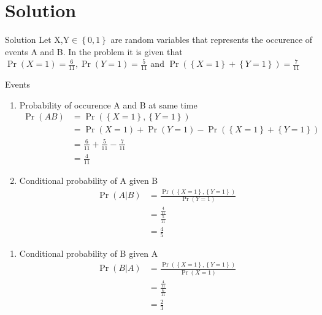 \documentclass{beamer}
\providecommand{\pr}[1]{\ensuremath{\Pr\left(#1\right)}}
\providecommand{\cbrak}[1]{\ensuremath{\left\{#1\right\}}}
\newcounter{saveenumi}
\newcommand{\seti}{\setcounter{saveenumi}{\value{enumi}}}
\newcommand{\conti}{\setcounter{enumi}{\value{saveenumi}}}
\begin{document}
	\section{Solution}	
	\begin{frame}{Solution}
		Let X,Y$\in \cbrak{0,1}$ are random variables that represents the occurence of events A and B. In the problem it is given that 
			$\pr{X=1}=\frac{6}{11},\pr{Y=1}=\frac{5}{11}$ and $\pr{\cbrak{X=1} +\cbrak{Y=1}}=\frac{7}{11}$
	\begin{table}[ht!]
	\centering
	
	\caption{Events}
	\label{table:1}
    \end{table}
	\end{frame}

	\begin{frame}{}
		\begin{enumerate}
			\item Probability of occurence A and B at same time
			\begin{align}
				\pr{AB}&=\pr{\cbrak{X=1},\cbrak{Y=1}}
				\\
				&=\pr{X=1}+\pr{Y=1}-\pr{\cbrak{X=1}+\cbrak{Y=1}}    
				\\
				&=\frac{6}{11}+\frac{5}{11}-\frac{7}{11}
				\\
				&=\frac{4}{11}     
			\end{align}
			\item Conditional probability of A given B
			\begin{align}
				\pr{A|B}&=\frac{\pr{\cbrak{X=1},\cbrak{Y=1}}}{\pr{Y=1}}\\
				&=\frac{\frac{4}{11}}{\frac{5}{11}}\\
				&=\frac{4}{5}
			\end{align}
		\seti
		\end{enumerate}
	\end{frame}

\begin{frame}{}
	\begin{enumerate}
		\conti
		\item Conditional probability  of B given A
	\begin{align}
		\pr{B|A}&=\frac{\pr{\cbrak{X=1},\cbrak{Y=1}}}{\pr{X=1}}\\
		&=\frac{\frac{4}{11}}{\frac{6}{11}}\\
		&=\frac{2}{3}
	\end{align}
\end{enumerate}
\end{frame}
\end{document}
